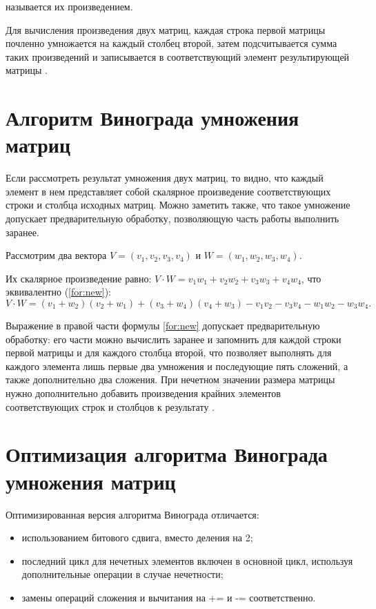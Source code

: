 называется их произведением.

Для вычисления произведения двух матриц, каждая строка первой матрицы почленно умножается на каждый столбец второй, затем подсчитывается сумма таких произведений и записывается в соответствующий элемент результирующей матрицы \cite{alg}.

\section{Алгоритм Винограда умножения матриц}

Если рассмотреть результат умножения двух матриц, то видно, что каждый элемент в нем представляет собой скалярное произведение соответствующих строки и столбца исходных матриц. Можно заметить также, что такое умножение допускает предварительную обработку, позволяющую часть работы выполнить заранее.

Рассмотрим два вектора $V = (v_1, v_2, v_3, v_4)$ и $W = (w_1, w_2, w_3, w_4)$.

Их скалярное произведение равно: $V \cdot W = v_1w_1 + v_2w_2 + v_3w_3 + v_4w_4$, что эквивалентно (\ref{for:new}):
\begin{equation}
	\label{for:new}
	V \cdot W = (v_1 + w_2)(v_2 + w_1) + (v_3 + w_4)(v_4 + w_3) - v_1v_2 - v_3v_4 - w_1w_2 - w_3w_4.
\end{equation}

Выражение в правой части формулы \ref{for:new} допускает предварительную обработку: его части можно вычислить заранее и запомнить для каждой строки первой матрицы и для каждого
столбца второй, что позволяет выполнять для каждого элемента лишь первые два умножения и последующие пять сложений, а также дополнительно два сложения. При нечетном значении размера матрицы нужно дополнительно добавить произведения крайних элементов соответствующих строк и столбцов к результату \cite{alg}.

\section{Оптимизация алгоритма Винограда умножения матриц}

Оптимизированная версия алгоритма Винограда отличается:

\begin{itemize}
	\item использованием битового сдвига, вместо деления на 2;
	\item последний цикл для нечетных элементов включен в основной цикл, используя дополнительные операции в случае нечетности;
	\item замены операций сложения и вычитания на += и -= соответственно.\cite{alg}
\end{itemize}

